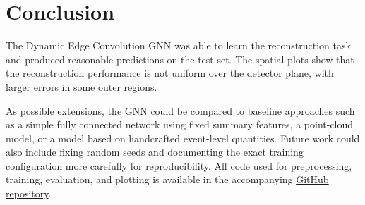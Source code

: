 \section{Conclusion}

The Dynamic Edge Convolution GNN was able to learn the reconstruction task and produced reasonable predictions on the test set. 
The spatial plots show that the reconstruction performance is not uniform over the detector plane, with larger errors in some outer regions.

As possible extensions, the GNN could be compared to baseline approaches such as a simple fully connected network using fixed summary features, 
a point-cloud model, or a model based on handcrafted event-level quantities. Future work could also include fixing random seeds and documenting the exact 
training configuration more carefully for reproducibility. All code used for preprocessing, training, evaluation, and plotting is available in the accompanying 
\href{https://github.com/AkramAki/Advanced_DeepLearning_Seminar}{GitHub repository}.

\printbibliography



